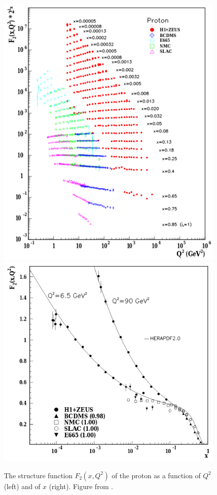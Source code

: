 \begin{figure}[t]
  \includegraphics[width=0.45\linewidth]{proton_f2.png}
  \includegraphics[width=0.54\linewidth]{proton_f2_vs_x.png}
  \caption{The structure function $F_2\left(x, Q^2\right)$ of the proton as a function of $Q^2$ (left) and of $x$ (right). Figure from .}
  \label{fig:proton_f2}
\end{figure}

